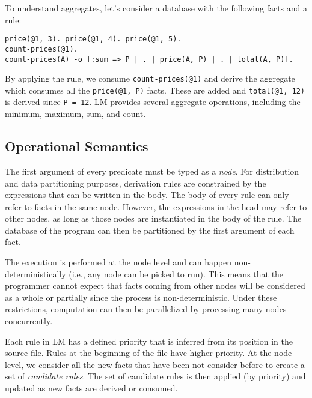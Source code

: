 To understand aggregates, let's consider a database with the following facts and a rule:

\begin{Verbatim}
price(@1, 3). price(@1, 4). price(@1, 5).
count-prices(@1).
count-prices(A) -o [:sum => P | . | price(A, P) | . | total(A, P)].
\end{Verbatim}

By applying the rule, we consume \texttt{count-prices(@1)} and
derive the aggregate which consumes all the \texttt{price(@1, P)} facts.
These are added and \texttt{total(@1,~12)} is derived since \texttt{P~=~12}.
LM provides several aggregate operations, including the minimum, maximum, sum, and count.

\subsection{Operational Semantics}

The first argument of every predicate must be typed as a \emph{node}.
For distribution and data partitioning purposes, derivation rules are constrained by the expressions that can be written in the body.
The body of every rule can only refer to facts in the same node.
However, the expressions in the head may refer to other nodes, as long as those nodes are instantiated in the body of the rule.
The database of the program can then be partitioned by the first argument of each fact.

The execution is performed at the node level and can happen non-deterministically (i.e., any node can
be picked to run). This means that the programmer cannot expect
that facts coming from other nodes will be considered as a whole or partially since the process is non-deterministic.
Under these restrictions, computation can then be parallelized by processing many nodes concurrently.

Each rule in LM has a defined priority that is inferred from its position in the source file.
Rules at the beginning of the file have higher priority. At the node level, we consider all
the new facts that have been not consider before to create a set of \emph{candidate rules}.
The set of candidate rules is then applied (by priority) and updated as new facts are derived or consumed.

